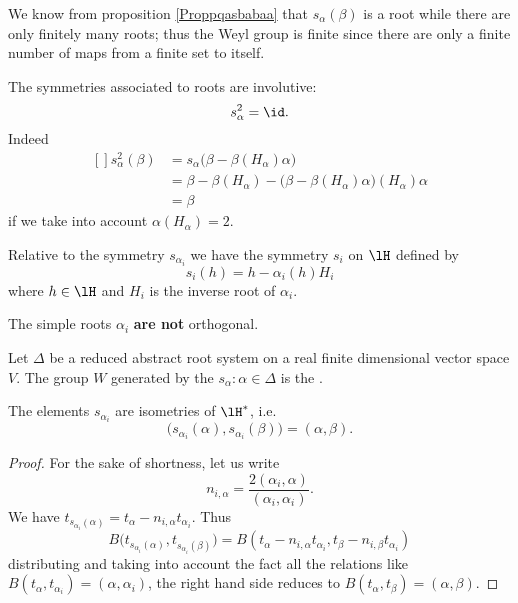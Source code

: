 We know from proposition \ref{Proppqasbabaa} that \( s_{\alpha}(\beta)\) is a root while there are only finitely many roots; thus the Weyl group is finite since there are only a finite number of maps from a finite set to itself.

The symmetries associated to roots are involutive:
\begin{equation}
    s_{\alpha}^2=\id.
\end{equation}
Indeed
\begin{equation}
    \begin{aligned}[]
        s^2_{\alpha}(\beta)&=s_{\alpha}\big( \beta-\beta(H_{\alpha})\alpha \big)\\
        &=\beta-\beta(H_{\alpha})-\big( \beta-\beta(H_{\alpha})\alpha \big)(H_{\alpha})\alpha\\
        &=\beta
    \end{aligned}
\end{equation}
if we take into account \( \alpha(H_{\alpha})=2\).

Relative to the symmetry \( s_{\alpha_i}\) we have the symmetry \( s_i\) on \( \lH\) defined by
\begin{equation}        \label{EqSymsiReltosalphai}
    s_i(h)=h-\alpha_i(h)H_i
\end{equation}
where \( h\in\lH\) and \( H_i\) is the inverse root of \( \alpha_i\).

\begin{remark}
    The simple roots \( \alpha_i\) {\bf are not} orthogonal.
\end{remark}

Let $\Delta$ be a reduced abstract root system on a real finite dimensional vector space $V$. The group $W$ generated by the $s_{\alpha}:\alpha\in\Delta$ is the .

\begin{proposition}     \label{PropWeylIsomalphai}
    The elements \( s_{\alpha_i}\) are isometries of \( \lH^*\), i.e.
    \begin{equation}
        \big( s_{\alpha_i}(\alpha),s_{\alpha_i}(\beta) \big)=(\alpha,\beta).
    \end{equation}
\end{proposition}

\begin{proof}
    For the sake of shortness, let us write
    \begin{equation}
        n_{i,\alpha}=\frac{ 2(\alpha_i,\alpha) }{ (\alpha_i,\alpha_i) }.
    \end{equation}
    We have \( t_{s_{\alpha_i}(\alpha)}=t_{\alpha}-n_{i,\alpha}t_{\alpha_i}\). Thus
    \begin{equation}
        B\big( t_{s_{\alpha_i}(\alpha)}, t_{s_{\alpha_i}(\beta)} \big)=B(t_{\alpha}-n_{i,\alpha}t_{\alpha_i},t_{\beta}-n_{i,\beta}t_{\alpha_i})
    \end{equation}
    distributing and taking into account the fact all the relations like \( B(t_{\alpha},t_{\alpha_i})=(\alpha,\alpha_i)\), the right hand side reduces to \( B(t_{\alpha},t_{\beta})=(\alpha,\beta)\).
\end{proof}

